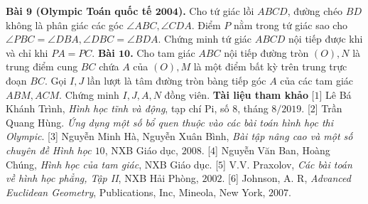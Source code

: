 \begin{multicols}{2}
	\vskip 0.1cm
	\textbf{\color{hoccungpi}Bài $\pmb{9}$ (Olympic Toán quốc tế $\pmb{2004}$).} Cho tứ giác lồi $ABCD$, đường chéo $BD$ không là phân giác các góc  $\angle ABC, \angle CDA$. Điểm $P$ nằm trong tứ giác sao cho  $\angle PBC = \angle DBA, \angle DBC = \angle BDA$. Chứng minh tứ giác $ABCD$ nội tiếp được khi và chỉ khi $PA=PC$.
	\vskip 0.1cm
	\textbf{\color{hoccungpi}Bài $\pmb{10}$.} Cho tam giác $ABC$ nội tiếp đường tròn $(O),N$ là trung điểm cung $BC$ chứa $A$ của $(O), M$ là một điểm bất kỳ trên trung trực đoạn $BC$. Gọi $I,J$ lần lượt là tâm đường tròn bàng tiếp góc $A$ của các tam giác $ABM,ACM$. Chứng minh $I,J,A,N$ đồng viên.
	\vskip 0.1cm
	\textbf{\color{hoccungpi}Tài liệu tham khảo}
	\vskip 0.1cm
	[$1$] Lê Bá Khánh Trình, \textit{Hình học tĩnh và động}, tạp chí Pi, số $8$, tháng $8/2019$. 
	\vskip 0.1cm
	[$2$] Trần Quang Hùng. \textit{Ứng dụng một số bổ quen thuộc vào các bài toán hình học thi Olympic}.
	\vskip 0.1cm
	[$3$] Nguyễn Minh Hà, Nguyễn Xuân Bình, \textit{Bài tập nâng cao và một số chuyên đề Hình học $10$}, NXB Giáo dục, $2008$.
	\vskip 0.1cm
	[$4$] Nguyễn Văn Ban, Hoàng Chúng, \textit{Hình học của tam giác}, NXB Giáo dục.
	\vskip 0.1cm
	[$5$] V.V. Praxolov, \textit{Các bài toán về hình học phẳng, Tập II}, NXB Hải Phòng, $2002$.
	\vskip 0.1cm
	[$6$] Johnson, A. R, \textit{Advanced Euclidean Geometry}, Publications, Inc, Mineola, New York, $2007$.
\end{multicols}

